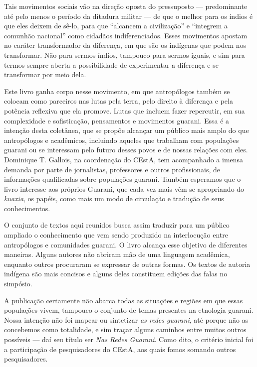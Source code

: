 Tais movimentos sociais vão na direção oposta do pressuposto ---
predominante até pelo menos o período da ditadura militar --- de que o
melhor para os índios é que eles deixem de sê-lo, para que ``alcancem a
civilização'' e ``integrem a comunhão nacional'' como cidadãos
indiferenciados. Esses movimentos apostam no caráter transformador da
diferença, em que são os indígenas que podem nos transformar. Não para
sermos índios, tampouco para sermos iguais, e sim para termos sempre
aberta a possibilidade de experimentar a diferença e se transformar por
meio dela.

Este livro ganha corpo nesse movimento, em que antropólogos também se
colocam como parceiros nas lutas pela terra, pelo direito à diferença e
pela potência reflexiva que ela promove. Lutas que incluem fazer
repercutir, em sua complexidade e sofisticação, pensamentos e movimentos
guarani. Essa é a intenção desta coletânea, que se propõe alcançar um
público mais amplo do que antropólogos e acadêmicos, incluindo aqueles
que trabalham com populações guarani ou se interessam pelo futuro desses
povos e de nossas relações com eles. Dominique T. Gallois, na
coordenação do CEstA, tem acompanhado a imensa demanda por parte de
jornalistas, professores e outros profissionais, de informações
qualificadas sobre populações guarani. Também esperamos que o livro
interesse aos próprios Guarani, que cada vez mais vêm se apropriando do
\emph{kuaxia}, os papéis, como mais um modo de circulação e tradução de
seus conhecimentos.

O conjunto de textos aqui reunidos busca assim traduzir para um público
ampliado o conhecimento que vem sendo produzido na interlocução entre
antropólogos e comunidades guarani. O livro alcança esse objetivo de
diferentes maneiras. Alguns autores não abriram mão de uma linguagem
acadêmica, enquanto outros procuraram se expressar de outras formas. Os
textos de autoria indígena são mais concisos e alguns deles constituem
edições das falas no simpósio.

A publicação certamente não abarca todas as situações e regiões em que
essas populações vivem, tampouco o conjunto de temas presentes na
etnologia guarani. Nossa intenção não foi mapear ou sintetizar \emph{as
redes guarani}, até porque não as concebemos como totalidade, e sim
traçar alguns caminhos entre muitos outros possíveis --- daí seu título
ser \emph{Nas Redes Guarani}. Como dito, o critério inicial foi a
participação de pesquisadores do CEstA, aos quais fomos somando outros
pesquisadores.

